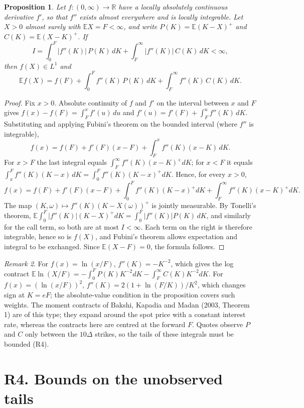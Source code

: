 \documentclass[11pt]{article}
\newtheorem{proposition}{Proposition}
\theoremstyle{remark}
\newtheorem{remark}[proposition]{Remark}
\newcommand{\E}{\mathbb{E}}
\begin{document}
\begin{proposition}
Let $f:(0,\infty)\to\mathbb{R}$ have a locally absolutely continuous derivative $f'$, so that $f''$ exists almost everywhere and is locally integrable. Let $X>0$ almost surely with $\E X=F<\infty$, and write $P(K)=\E(K-X)^+$ and $C(K)=\E(X-K)^+$. If
\[
I=\int_0^F|f''(K)|\,P(K)\,dK+\int_F^\infty|f''(K)|\,C(K)\,dK<\infty,
\]
then $f(X)\in L^1$ and
\[
\E f(X)=f(F)+\int_0^F f''(K)\,P(K)\,dK+\int_F^\infty f''(K)\,C(K)\,dK.
\]
\end{proposition}

\begin{proof}
Fix $x>0$. Absolute continuity of $f$ and $f'$ on the interval between $x$ and $F$ gives $f(x)-f(F)=\int_F^x f'(u)\,du$ and $f'(u)=f'(F)+\int_F^u f''(K)\,dK$. Substituting and applying Fubini's theorem on the bounded interval (where $f''$ is integrable),
\[
f(x)=f(F)+f'(F)(x-F)+\int_F^x f''(K)(x-K)\,dK.
\]
For $x>F$ the last integral equals $\int_F^\infty f''(K)(x-K)^+dK$; for $x<F$ it equals $\int_x^F f''(K)(K-x)\,dK=\int_0^F f''(K)(K-x)^+dK$. Hence, for every $x>0$,
\[
f(x)=f(F)+f'(F)(x-F)+\int_0^F f''(K)(K-x)^+dK+\int_F^\infty f''(K)(x-K)^+dK.
\]
The map $(K,\omega)\mapsto f''(K)(K-X(\omega))^+$ is jointly measurable. By Tonelli's theorem, $\E\int_0^F|f''(K)|(K-X)^+dK=\int_0^F|f''(K)|P(K)\,dK$, and similarly for the call term, so both are at most $I<\infty$. Each term on the right is therefore integrable, hence so is $f(X)$, and Fubini's theorem allows expectation and integral to be exchanged. Since $\E(X-F)=0$, the formula follows.
\end{proof}

\begin{remark}
For $f(x)=\ln(x/F)$, $f''(K)=-K^{-2}$, which gives the log contract $\E\ln(X/F)=-\int_0^F P(K)K^{-2}dK-\int_F^\infty C(K)K^{-2}dK$. For $f(x)=(\ln(x/F))^2$, $f''(K)=2(1+\ln(F/K))/K^2$, which changes sign at $K=eF$; the absolute-value condition in the proposition covers such weights. The moment contracts of Bakshi, Kapadia and Madan (2003, Theorem 1) are of this type; they expand around the spot price with a constant interest rate, whereas the contracts here are centred at the forward $F$. Quotes observe $P$ and $C$ only between the $10\Delta$ strikes, so the tails of these integrals must be bounded (R4).
\end{remark}

\section*{R4. Bounds on the unobserved tails}
\end{document}
